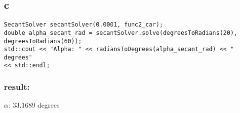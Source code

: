 \documentclass[a4paper]{article}
\begin{document}
\subsection*{c}
\begin{lstlisting}
SecantSolver secantSolver(0.0001, func2_car);
double alpha_secant_rad = secantSolver.solve(degreesToRadians(20), degreesToRadians(60));
std::cout << "Alpha: " << radiansToDegrees(alpha_secant_rad) << " degrees" 
<< std::endl;
\end{lstlisting}
\subsubsection*{result:}
$\alpha$: 33.1689 degrees
\end{document}
